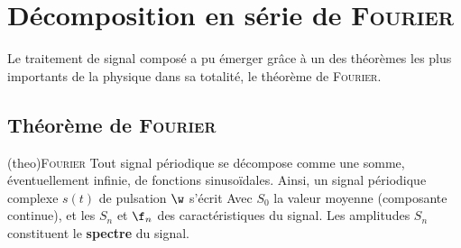 \documentclass[../../main/main.tex]{subfiles}
\begin{document}
%

\section{Décomposition en série de \textsc{Fourier}}
Le traitement de signal composé a pu émerger grâce à un des théorèmes les plus
importants de la physique dans sa totalité, le théorème de \textsc{Fourier}.
\vspace{-15pt}

\subsection{Théorème de \textsc{Fourier}}
\begin{tcb*}[breakable](theo){\textsc{Fourier}}
	Tout signal périodique se décompose comme une somme, éventuellement infinie,
	de fonctions sinusoïdales. Ainsi, un signal périodique complexe $s(t)$ de
	pulsation $\w$ s'écrit
	\psw{%
		\[
			s(t) = S_0 + \sum_{n=1}^{+\infty} s_n(t)
			\Lra
			s(t) = S_0 + \sum_{n=1}^{+\infty} S_n \cos(n\w t + \f_n)
		\]
	}%
	Avec $S_0$ la valeur moyenne (composante continue), et les $S_n$ et $\f_n$ des
	caractéristiques du signal. Les amplitudes $S_n$ constituent le
	\textbf{spectre} du signal.
\end{tcb*}
\end{document}
